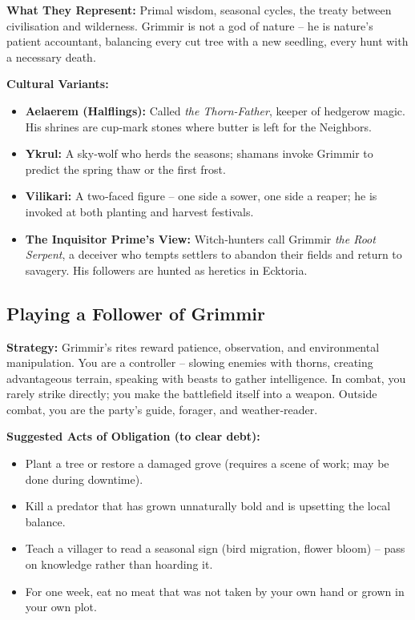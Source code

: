 \documentclass[10pt,a5paper]{book}
\begin{document}
\textbf{What They Represent:} Primal wisdom, seasonal cycles, the treaty between civilisation and wilderness. Grimmir is not a god of nature – he is nature’s patient accountant, balancing every cut tree with a new seedling, every hunt with a necessary death.

\textbf{Cultural Variants:}
\begin{itemize}
    \item \textbf{Aelaerem (Halflings):} Called \textit{the Thorn-Father}, keeper of hedgerow magic. His shrines are cup‑mark stones where butter is left for the Neighbors.
    \item \textbf{Ykrul:} A sky‑wolf who herds the seasons; shamans invoke Grimmir to predict the spring thaw or the first frost.
    \item \textbf{Vilikari:} A two‑faced figure – one side a sower, one side a reaper; he is invoked at both planting and harvest festivals.
    \item \textbf{The Inquisitor Prime’s View:} Witch‑hunters call Grimmir \textit{the Root Serpent}, a deceiver who tempts settlers to abandon their fields and return to savagery. His followers are hunted as heretics in Ecktoria.
\end{itemize}

\subsection*{Playing a Follower of Grimmir}

\textbf{Strategy:} Grimmir’s rites reward patience, observation, and environmental manipulation. You are a controller – slowing enemies with thorns, creating advantageous terrain, speaking with beasts to gather intelligence. In combat, you rarely strike directly; you make the battlefield itself into a weapon. Outside combat, you are the party’s guide, forager, and weather‑reader.

\textbf{Suggested Acts of Obligation (to clear debt):}
\begin{itemize}
    \item Plant a tree or restore a damaged grove (requires a scene of work; may be done during downtime).
    \item Kill a predator that has grown unnaturally bold and is upsetting the local balance.
    \item Teach a villager to read a seasonal sign (bird migration, flower bloom) – pass on knowledge rather than hoarding it.
    \item For one week, eat no meat that was not taken by your own hand or grown in your own plot.
\end{itemize}
\end{document}
